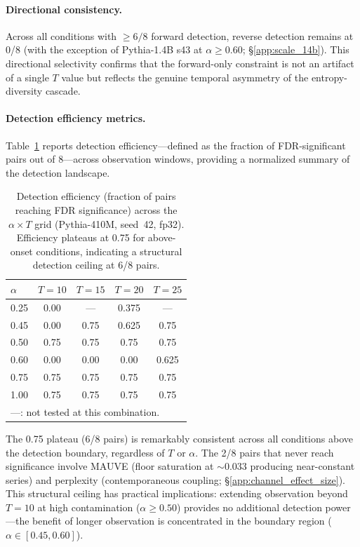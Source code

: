 \paragraph{Directional consistency.}
Across all conditions with ${\geq}6/8$ forward detection, reverse detection remains at 0/8 (with the exception of Pythia-1.4B s43 at $\alpha{\geq}0.60$; \S\ref{app:scale_14b}).
This directional selectivity confirms that the forward-only constraint is not an artifact of a single $T$ value but reflects the genuine temporal asymmetry of the entropy-diversity cascade.

\paragraph{Detection efficiency metrics.}
Table~\ref{tab:detection_efficiency} reports detection efficiency---defined as the fraction of FDR-significant pairs out of 8---across observation windows, providing a normalized summary of the detection landscape.

\begin{table}[H]
\centering
\small
\caption{Detection efficiency (fraction of pairs reaching FDR significance) across the $\alpha \times T$ grid (Pythia-410M, seed~42, fp32). Efficiency plateaus at 0.75 for above-onset conditions, indicating a structural detection ceiling at 6/8 pairs.}
\label{tab:detection_efficiency}
\begin{tabular}{lcccc}
\toprule
$\alpha$ & $T{=}10$ & $T{=}15$ & $T{=}20$ & $T{=}25$ \\
\midrule
0.25 & 0.00 & --- & 0.375 & --- \\
0.45 & 0.00 & 0.75 & 0.625 & 0.75 \\
0.50 & 0.75 & 0.75 & 0.75 & 0.75 \\
0.60 & 0.00 & 0.00 & 0.00 & 0.625 \\
0.75 & 0.75 & 0.75 & 0.75 & 0.75 \\
1.00 & 0.75 & 0.75 & 0.75 & 0.75 \\
\bottomrule
\multicolumn{5}{l}{\footnotesize ---: not tested at this combination.}
\end{tabular}
\end{table}

The 0.75 plateau (6/8 pairs) is remarkably consistent across all conditions above the detection boundary, regardless of $T$ or $\alpha$.
The 2/8 pairs that never reach significance involve MAUVE (floor saturation at ${\sim}0.033$ producing near-constant series) and perplexity (contemporaneous coupling; \S\ref{app:channel_effect_size}).
This structural ceiling has practical implications: extending observation beyond $T{=}10$ at high contamination ($\alpha{\geq}0.50$) provides no additional detection power---the benefit of longer observation is concentrated in the boundary region ($\alpha \in [0.45, 0.60]$).

